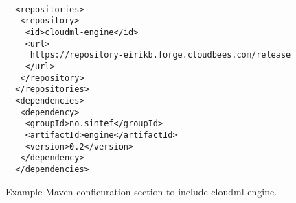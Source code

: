 \begin{figure}[tb]
  \begin{center}
    \begin{verbatim}

  <repositories>
   <repository>
    <id>cloudml-engine</id>
    <url>
     https://repository-eirikb.forge.cloudbees.com/release
    </url>
   </repository>
  </repositories>
  <dependencies>
   <dependency>
    <groupId>no.sintef</groupId>
    <artifactId>engine</artifactId>
    <version>0.2</version>
   </dependency>
  </dependencies>
    \end{verbatim}
  \end{center}
  \caption{Example Maven conficuration section to include cloudml-engine.}
  \label{list:pom-example}
\end{figure}

